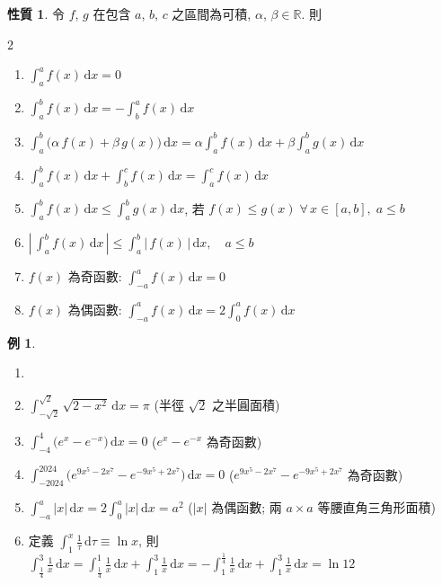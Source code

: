 \documentclass[12pt]{extarticle}
\newcommand{\ds}{\displaystyle}
\theoremstyle{definition}
\newtheorem*{prp}{性質}
\newtheorem*{ex}{例}
\begin{document}
\begin{prp}
  令 $f$, $g$ 在包含 $a$, $b$, $c$ 之區間為可積, $\alpha$, $\beta\in\mathbb{R}$. 則
  \begin{multicols}{2}
    \begin{enumerate}\setlength{\itemsep}{0pt}
      \item $\ds\int_a^a f(x)\,\mathrm{d}x = 0$
      \item $\ds\int_a^b f(x)\,\mathrm{d}x = -\int_b^a f(x)\,\mathrm{d}x$
      \item $\ds\int_a^b \big(\alpha\,f(x) + \beta\,g(x)\big)\,\mathrm{d}x = \alpha\int_a^b f(x)\,\mathrm{d}x + \beta\int_a^b g(x)\,\mathrm{d}x$
      \item $\ds\int_a^b f(x)\,\mathrm{d}x + \int_b^c f(x)\,\mathrm{d}x = \int_a^c f(x)\,\mathrm{d}x$
      \item $\ds\int_a^b f(x)\,\mathrm{d}x\leqslant\int_a^b g(x)\,\mathrm{d}x$, 若 $f(x)\leqslant g(x)\;\forall\,x\in[a, b],\;a\leqslant b$
      \item $\ds\left|\,\int_a^b f(x)\,\mathrm{d}x\,\right|\leqslant \int_a^b \left|\,f(x)\,\right|\,\mathrm{d}x, \quad a\leqslant b$ 
      \item $f(x)$ 為奇函數: $\ds\int_{-a}^a f(x)\,\mathrm{d}x = 0$
      \item $f(x)$ 為偶函數: $\ds\int_{-a}^a f(x)\,\mathrm{d}x = 2\int_0^a f(x)\,\mathrm{d}x$
    \end{enumerate}
  \end{multicols}
\end{prp}

\begin{ex}
  \begin{enumerate}\setlength{\itemsep}{0pt}
    \item[]
    \item $\ds\int_{-\sqrt{2}}^{\sqrt{2}} \sqrt{2 - x^2}\,\mathrm{d}x = \pi$ (半徑 $\sqrt{2}$ 之半圓面積) 
    \item $\ds\int_{-4}^{4} \big(e^{x} - e^{-x}\big)\,\mathrm{d}x = 0$ ($e^{x} - e^{-x}$ 為奇函數) 
    \item $\ds\int_{-2024}^{2024} \big(e^{9x^5-2x^7} - e^{-9x^5 + 2x^7}\big)\,\mathrm{d}x = 0$ ($e^{9x^5-2x^7} - e^{-9x^5 + 2x^7}$ 為奇函數)  
    \item $\ds\int_{-a}^a |x|\,\mathrm{d}x = 2\int_0^a |x|\,\mathrm{d}x = a^2$ ($|x|$ 為偶函數; 兩 $a\times a$ 等腰直角三角形面積) 
    \item 定義 $\ds\int_1^x\frac{1}{\tau}\,\mathrm{d}\tau\equiv\ln x$, 則 $\ds\int_{\frac{1}{4}}^3\frac{1}{x}\,\mathrm{d}x = \int_{\frac{1}{4}}^1 \frac{1}{x}\,\mathrm{d}x + \int_1^3 \frac{1}{x}\,\mathrm{d}x = -\int_1^{\frac{1}{4}}\frac{1}{x}\,\mathrm{d}x + \int_1^3\frac{1}{x}\,\mathrm{d}x = \ln 12$
  \end{enumerate}
\end{ex}
\end{document}
